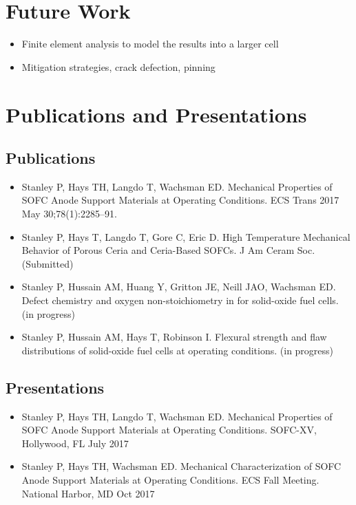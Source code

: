 \section{Future Work}
\begin{itemize}
    \item Finite element analysis to model the results into a larger cell
    \item Mitigation strategies, crack defection, pinning %
\end{itemize}

\section{Publications and Presentations}
    \subsection*{Publications}
        \begin{itemize}
            \item Stanley P, Hays TH, Langdo T, Wachsman ED. Mechanical Properties of SOFC Anode Support Materials at Operating Conditions. ECS Trans 2017 May 30;78(1):2285–91.
            \item Stanley P, Hays T, Langdo T, Gore C, Eric D. High Temperature Mechanical Behavior of Porous Ceria and Ceria-Based SOFCs. J Am Ceram Soc.  (Submitted)
            \item Stanley P, Hussain AM, Huang Y, Gritton JE, Neill JAO, Wachsman ED. Defect chemistry and oxygen non-stoichiometry in  for solid-oxide fuel cells. (in progress)
            \item Stanley P, Hussain AM, Hays T, Robinson I. Flexural strength and flaw distributions of  solid-oxide fuel cells at operating conditions. (in progress)
        \end{itemize}

    \subsection*{Presentations}
    \begin{itemize}
        \item Stanley P, Hays TH, Langdo T, Wachsman ED. Mechanical Properties of SOFC Anode Support Materials at Operating Conditions. SOFC-XV, Hollywood, FL  July 2017
        \item Stanley P, Hays TH,  Wachsman ED. Mechanical Characterization of SOFC Anode Support Materials at Operating Conditions. ECS Fall Meeting. National Harbor, MD Oct 2017
    \end{itemize}
